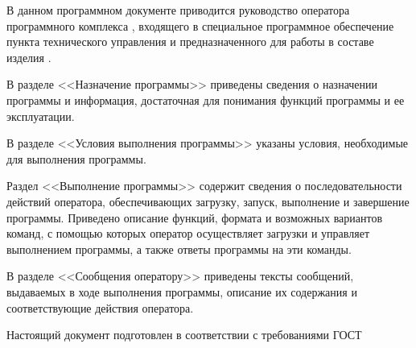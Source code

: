 \newpage\annotation

В данном программном документе приводится руководство оператора программного комплекса \programname, входящего в специальное программное обеспечение пункта технического управления и предназначенного для работы в составе изделия \productname.

В разделе <<Назначение программы>> приведены сведения о назначении программы и информация, достаточная для понимания функций программы и ее эксплуатации.

В разделе <<Условия выполнения программы>> указаны условия, необходимые для выполнения программы.

Раздел <<Выполнение программы>> содержит сведения о последовательности действий оператора, обеспечивающих загрузку, запуск, выполнение и завершение программы. Приведено описание функций, формата и возможных вариантов команд, с помощью которых оператор осуществляет загрузки и управляет выполнением программы, а также ответы программы на эти команды.

В разделе <<Сообщения оператору>> приведены тексты сообщений, выдаваемых в ходе выполнения программы, описание их содержания и соответствующие действия оператора.

Настоящий документ подготовлен в соответствии с требованиями ГОСТ~\cite{gost19505}
